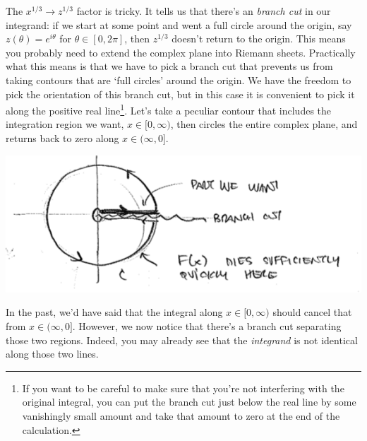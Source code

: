   The $x^{1/3} \to z^{1/3}$ factor is tricky. It tells us that there's an \emph{branch cut} in our integrand: if we start at some point and went a full circle around the origin, say $z(\theta) = e^{i\theta}$ for $\theta\in[0,2\pi]$, then $z^{1/3}$ doesn't return to the origin. This means you probably need to extend the complex plane into Riemann sheets. Practically what this means is that we have to pick a branch cut that prevents us from taking contours that are `full circles' around the origin. We have the freedom to pick the orientation of this branch cut, but in this case it is convenient to pick it along the positive real line\footnote{If you want to be careful to make sure that you're not interfering with the original integral, you can put the branch cut just below the real line by some vanishingly small amount and take that amount to zero at the end of the calculation.}. Let's take a peculiar contour that includes the integration region we want, $x\in [0,\infty)$, then circles the entire complex plane, and returns back to zero along $x\in (\infty, 0]$. 
 \begin{center}
 \includegraphics[width=.8\textwidth]{figures/Lec_2017_14_branch.png}
 \end{center}
 In the past, we'd have said that the integral along $x\in [0, \infty)$ should cancel that from $x\in (\infty, 0]$. However, we now notice that there's a branch cut separating those two regions. Indeed, you may already see that the \emph{integrand} is not identical along those two lines. 

